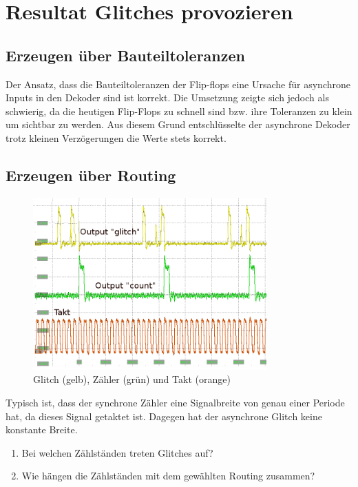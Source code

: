 \section{Resultat Glitches provozieren}\label{sect.glitch_resultat}

\subsection{Erzeugen über Bauteiltoleranzen}
Der Ansatz, dass die Bauteiltoleranzen der Flip-flops eine Ursache für asynchrone Inputs in den Dekoder sind ist korrekt. Die Umsetzung zeigte sich jedoch als schwierig, da die heutigen Flip-Flops zu schnell sind bzw. ihre Toleranzen zu klein um sichtbar zu werden.  Aus diesem Grund entschlüsselte der asynchrone Dekoder trotz kleinen Verzögerungen die Werte stets korrekt.\\



\subsection{Erzeugen über Routing} 
\begin{figure}[H]
	\centering
	\includegraphics[width=0.8\textwidth]{images/glitch/Glitch_2_good_kommentar.png}
	\caption{Glitch (gelb), Zähler (grün) und Takt (orange)}
	\label{fig.glitch.result_1}
\end{figure}

Typisch ist, dass der synchrone Zähler eine Signalbreite von genau einer Periode hat, da dieses Signal getaktet ist. Dagegen hat der asynchrone Glitch keine konstante Breite.
\begin{enumerate}
	\item{Bei welchen Zählständen treten Glitches auf?}

	\item{Wie hängen die Zählständen mit dem gewählten Routing zusammen?}

\end{enumerate}
